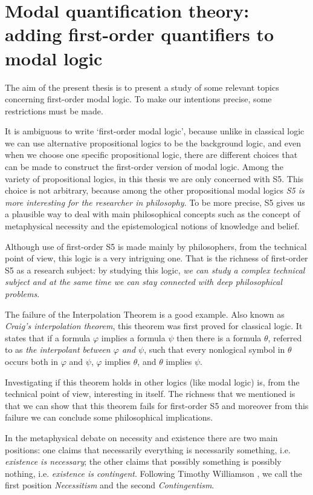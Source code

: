 \section{Modal quantification theory: adding first-order quantifiers to modal logic}
\qquad The aim of the present thesis is to present a study of some relevant topics concerning first-order modal logic. To make our intentions precise, some restrictions must be made.

\qquad It is ambiguous to write `first-order modal logic', because unlike in classical logic we can use alternative propositional logics to be the background logic, and even when we choose one specific propositional logic, there are different choices that can be made to construct the first-order version of modal logic. Among the variety of propositional logics, in this thesis we are only concerned with S5. This choice is not arbitrary, because among the other propositional modal logics \textit{S5 is more interesting for the researcher in philosophy}. To be more precise, S5 gives us a plausible way to deal with main philosophical concepts such as the concept of metaphysical necessity and the epistemological notions of knowledge and belief.

\qquad Although use of first-order S5 is made mainly by philosophers, from the technical point of view, this logic is a very intriguing one. That is the richness of first-order S5 as a research subject: by studying this logic, \textit{we can study a complex technical subject and at the same time we can stay connected with deep philosophical problems}.


\qquad The failure of the Interpolation Theorem is a good example. Also known as \textit{Craig's interpolation theorem}, this theorem was first proved for classical logic. It states that if a formula $\varphi$ implies a formula $\psi$ then there is a formula  $\theta$, referred to as \textit{the interpolant between $\varphi$ and $\psi$}, such that every nonlogical symbol in $\theta$ occurs both in $\varphi$ and $\psi$, $\varphi$ implies $\theta$, and $\theta$ implies $\psi$.   

\qquad Investigating if this theorem holds in other logics (like modal logic) is, from the technical point of view, interesting in itself. The richness that we mentioned is that we can show that this theorem fails for first-order S5 and moreover from this failure we can conclude some philosophical implications.

\qquad In the metaphysical debate on necessity and existence there are two main positions: one claims that necessarily everything is necessarily something, i.e. \textit{existence is necessary}; the other claims that possibly something is possibly nothing, i.e. \textit{existence is contingent}. Following Timothy Williamson \cite{Willi}, we call the first position \textit{Necessitism} and the second \textit{Contingentism}. 

